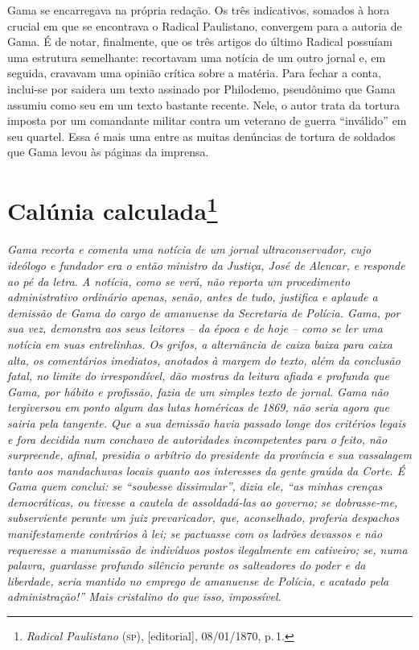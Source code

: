 \begin{argumento}
Gama se encarregava na própria redação. Os três indicativos, somados à
hora crucial em que se encontrava o \textnormal{Radical Paulistano}, convergem
para a autoria de Gama. É de notar, finalmente, que os três artigos do
último Radical possuíam uma estrutura semelhante: recortavam uma notícia
de um outro jornal e, em seguida, cravavam uma opinião crítica sobre a
matéria. Para fechar a conta, inclui-se por saidera um texto assinado
por Philodemo, pseudônimo que Gama assumiu como seu em um texto bastante
recente. Nele, o autor trata da tortura imposta por um comandante
militar contra um veterano de guerra ``inválido'' em seu quartel. Essa é
mais uma entre as muitas denúncias de tortura de soldados que Gama levou
às páginas da imprensa.
\end{argumento}


\chapter{Calúnia calculada\footnote{\emph{Radical Paulistano} (\textsc{sp}), {[}editorial{]}, 08/01/1870, p.\,1.}} %

\begin{didascalia}

\emph{Gama recorta e comenta uma notícia de um jornal ultraconservador,
cujo ideólogo e fundador era o então ministro da Justiça, José de
Alencar, e responde ao pé da letra. A notícia, como se verá, não reporta
um procedimento administrativo ordinário apenas, senão, antes de tudo,
justifica e aplaude a demissão de Gama do cargo de amanuense da
Secretaria de Polícia. Gama, por sua vez, demonstra aos seus leitores --
da época e de hoje -- como se ler uma notícia em suas entrelinhas. Os
grifos, a alternância de caixa baixa para caixa alta, os comentários
imediatos, anotados à margem do texto, além da conclusão fatal, no
limite do irrespondível, dão mostras da leitura afiada e profunda que
Gama, por hábito e profissão, fazia de um simples texto de jornal. Gama
não tergiversou em ponto algum das lutas homéricas de 1869, não seria
agora que sairia pela tangente. Que a sua demissão havia passado longe
dos critérios legais e fora decidida num conchavo de autoridades
incompetentes para o feito, não surpreende, afinal, presidia o arbítrio
do presidente da província e sua vassalagem tanto aos mandachuvas locais
quanto aos interesses da gente graúda da Corte. É Gama quem conclui: se
``soubesse dissimular'', dizia ele, ``as minhas crenças democráticas, ou
tivesse a cautela de assoldadá-las ao governo; se dobrasse-me,
subserviente perante um juiz prevaricador, que, aconselhado, proferia
despachos manifestamente contrários à lei; se pactuasse com os ladrões
devassos e não requeresse a manumissão de indivíduos postos ilegalmente
em cativeiro; se, numa palavra, guardasse profundo silêncio perante os
salteadores do poder e da liberdade, seria mantido no emprego de
amanuense de Polícia, e acatado pela administração!'' Mais cristalino do
que isso, impossível.}
\end{didascalia}


